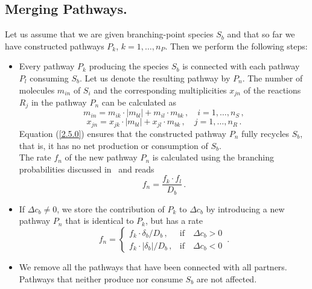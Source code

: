 \subsection{Merging Pathways.}
\label{sec2c3}
Let us assume that we are given branching-point species $S_b$ and that so far we have constructed pathways $P_k$, $k=1,\ldots,n_P$.  Then we perform the following steps:
\begin{itemize}
\item {Every pathway $P_k$ producing the species $S_b$ is connected with each pathway $P_l$ consuming $S_b$. Let us denote the resulting pathway by $P_n$. The number of molecules $m_{in}$ of $S_i$ and the corresponding multiplicities $x_{jn}$ of the reactions $R_j$ in the pathway $P_n$ can be calculated as
\begin{equation}
m_{in} = m_{ik}\cdot|m_{bl}| + m_{il}\cdot m_{bk} \,, \quad i = 1,\ldots, n_S\,,
\label{2.5.0}
\end{equation}
\begin{equation}
x_{jn} = x_{jk}\cdot|m_{bl}| + x_{jl}\cdot m_{bk} \,, \quad j = 1,\ldots, n_R\,.
\label{2.5.1}
\end{equation}
Equation (\ref{2.5.0}) ensures that the constructed pathway $P_n$ fully recycles $S_b$, that is, it has no net production or consumption of $S_b$. 
\\ The rate $f_n$ of the new pathway $P_n$ is calculated using the branching probabilities discussed in~\cite{Lehman2003} and reads
\begin{equation}
f_n = \frac{f_k\cdot f_l}{D_b}\,.
\label{2.5.2}
\end{equation}
}
\item {If $\Delta c_b\neq 0$, we store the contribution of $P_k$ to $\Delta c_b$ by introducing a new pathway $P_n$ that is identical to $P_k$, but has a rate
\begin{equation}
f_n = \left\{\begin{array}{cc} f_k\cdot \delta_b / D_b\,, & \mathrm{if}\quad \Delta c_b > 0 \\ f_k\cdot |\delta_b| / D_b\,, & \mathrm{if}\quad \Delta c_b <0 \end{array}\right.\,.
\label{2.5.3}
\end{equation}
}
\item {We remove all the pathways that have been connected with all partners. Pathways that neither produce nor consume $S_b$ are not affected.}
\end{itemize}


